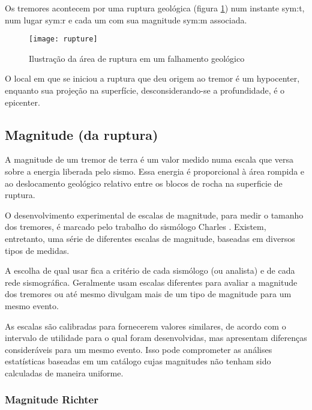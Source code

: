 Os tremores acontecem por uma ruptura geológica (figura \ref{f:rupture}) 
num instante \gls{sym:t}, num lugar \gls{sym:r} e cada um
com sua magnitude \gls{sym:m} associada.

\begin{figure}[H]
   \centering
   \texttt{[image: rupture]}
   \caption[Ilustração da área de ruptura em um falhamento geológico]
   		   {Ilustração da área de ruptura em um falhamento geológico\footnotemark} 
   \label{f:rupture}
\end{figure} 


O local em que se iniciou a ruptura que deu origem ao tremor é um \gls{hypocenter},
enquanto sua projeção na superfície, desconsiderando-se a profundidade, é o \gls{epicenter}.


\subsection[Magnitude]{Magnitude (da ruptura)}
\label{sec:magnitude}

A magnitude de um tremor de terra é um valor medido numa escala que versa sobre a energia liberada pelo sismo.
Essa energia é proporcional à área rompida e ao deslocamento geológico relativo entre os blocos de rocha na superficie
de ruptura.

O desenvolvimento experimental de escalas de magnitude, para medir o tamanho dos tremores,
é marcado pelo trabalho do sismólogo Charles \citet{richter_1935}. Existem, entretanto, 
uma série de diferentes escalas de magnitude, baseadas em diversos tipos de medidas. 

A escolha de qual usar fica a critério
de cada sismólogo (ou analista) e de cada rede sismográfica. 
Geralmente usam escalas diferentes
para avaliar a magnitude dos tremores ou até mesmo divulgam mais de um tipo de magnitude para
um mesmo evento.

As escalas são calibradas para fornecerem valores similares, de acordo com
o intervalo de utilidade para o qual foram desenvolvidas, mas apresentam diferenças consideráveis para um mesmo evento.
Isso pode comprometer as análises estatísticas baseadas em um catálogo 
cujas magnitudes não tenham sido calculadas de maneira uniforme.


\subsubsection{Magnitude Richter}
\label{sec:magnitude_richter}

